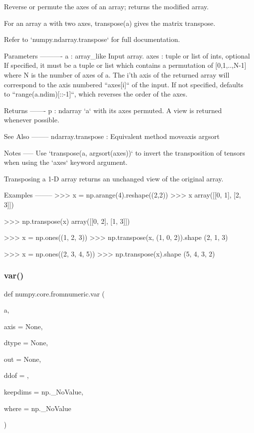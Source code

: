 \begin{DoxyVerb}Reverse or permute the axes of an array; returns the modified array.

For an array a with two axes, transpose(a) gives the matrix transpose.

Refer to `numpy.ndarray.transpose` for full documentation.

Parameters
----------
a : array_like
    Input array.
axes : tuple or list of ints, optional
    If specified, it must be a tuple or list which contains a permutation of
    [0,1,..,N-1] where N is the number of axes of a.  The i'th axis of the
    returned array will correspond to the axis numbered ``axes[i]`` of the
    input.  If not specified, defaults to ``range(a.ndim)[::-1]``, which
    reverses the order of the axes.

Returns
-------
p : ndarray
    `a` with its axes permuted.  A view is returned whenever
    possible.

See Also
--------
ndarray.transpose : Equivalent method
moveaxis
argsort

Notes
-----
Use `transpose(a, argsort(axes))` to invert the transposition of tensors
when using the `axes` keyword argument.

Transposing a 1-D array returns an unchanged view of the original array.

Examples
--------
>>> x = np.arange(4).reshape((2,2))
>>> x
array([[0, 1],
       [2, 3]])

>>> np.transpose(x)
array([[0, 2],
       [1, 3]])

>>> x = np.ones((1, 2, 3))
>>> np.transpose(x, (1, 0, 2)).shape
(2, 1, 3)

>>> x = np.ones((2, 3, 4, 5))
>>> np.transpose(x).shape
(5, 4, 3, 2)\end{DoxyVerb}
 \mbox{\label{namespacenumpy_1_1core_1_1fromnumeric_afee4e68150f0d18870f470901cfb2977}} 
\subsubsection{\texorpdfstring{var()}{var()}}
{\footnotesize\ttfamily def numpy.\+core.\+fromnumeric.\+var (\begin{DoxyParamCaption}\item[{}]{a,  }\item[{}]{axis = {\ttfamily None},  }\item[{}]{dtype = {\ttfamily None},  }\item[{}]{out = {\ttfamily None},  }\item[{}]{ddof = {},  }\item[{}]{keepdims = {\ttfamily np.\+\_\+NoValue},  }\item[{}]{where = {\ttfamily np.\+\_\+NoValue} }\end{DoxyParamCaption})}

